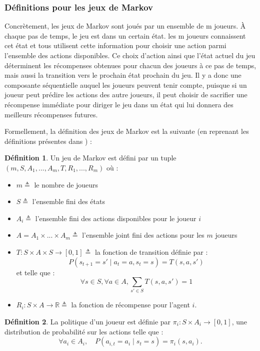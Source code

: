 \documentclass{article}
\theoremstyle{definition}
\newtheorem{definition}{Définition}
\begin{document}
\subsubsection{Définitions pour les jeux de Markov}
Concrètement, les jeux de Markov sont joués par un ensemble de m joueurs. À chaque pas de temps, le jeu est dans un certain état.  les m joueurs connaissent cet état et tous utilisent cette information pour choisir une action parmi l'ensemble des actions disponibles. Ce choix d'action ainsi que l'état actuel du jeu déterminent les récompenses obtenues pour chacun des joueurs à ce pas de temps, mais aussi la transition vers le prochain état prochain du jeu. Il y a donc une composante séquentielle auquel les joueurs peuvent tenir compte, puisque si un joueur peut prédire les actions des autre joueurs, il peut choisir de sacrifier une récompense immédiate pour diriger le jeu dans un état qui lui donnera des meilleurs récompenses futures. 

Formellement, la définition des jeux de Markov est la suivante (en reprenant les définitions présentes dans \citet{matignon_independent_2012}) : 


\begin{definition}
Un jeu de Markov est défini par un tuple $(m, S, A_{1}, ..., A_{m}, T, R_{1}, ..., R_{m})$ où :
\begin{itemize}
    \item $m \triangleq$ le nombre de joueurs
    \item $S \triangleq$ l'ensemble fini des états 
    \item $A_{i} \triangleq$ l'ensemble fini des actions disponibles pour le joueur $i$
    \item $A = A_{1} \times ... \times A_{m} \triangleq$ l'ensemble joint fini des actions pour les $m$ joueurs 
    \item $T : S \times A \times S \rightarrow [0,1] \triangleq$ la fonction de transition définie par :
    \[
    P(s_{t+1}=s' \mid a_{t} = a, s_{t} = s) = T(s,a,s')
    \]
    et telle que :
    \[
    \forall s \in S, \forall a \in A, \sum_{s' \in S} T(s,a,s') = 1
    \]
    \item $R_{i} : S \times A \rightarrow \mathbb{R} \triangleq$ la fonction de récompense pour l'agent $i$.
\end{itemize}
\end{definition}

\begin{definition}
La politique d'un joueur est définie par $\pi_{i}: S \times A_{i} \rightarrow [0,1]$, une distribution de probabilité sur les actions telle que :
\[
\forall a_{i} \in A_{i}, \quad P(a_{i,t}=a_{i} \mid s_{t}=s) = \pi_{i}(s,a_{i}).
\]
\end{definition}
\end{document}
